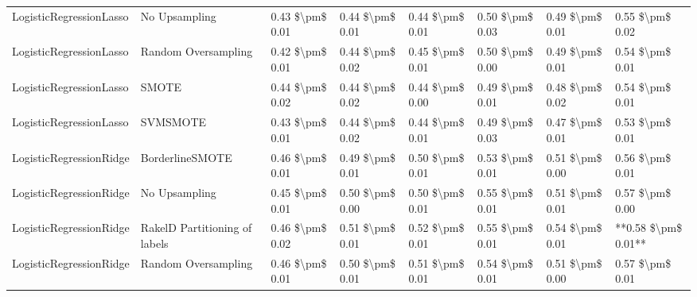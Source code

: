 \begin{tabular}{llllllll}
        LogisticRegressionLasso &                 No Upsampling & 0.43 \$\textbackslash pm\$ 0.01 &           0.44 \$\textbackslash pm\$ 0.01 &       0.44 \$\textbackslash pm\$ 0.01 &        0.50 \$\textbackslash pm\$ 0.03 &                         0.49 \$\textbackslash pm\$ 0.01 &     0.55 \$\textbackslash pm\$ 0.02 \\
        LogisticRegressionLasso &           Random Oversampling & 0.42 \$\textbackslash pm\$ 0.01 &           0.44 \$\textbackslash pm\$ 0.02 &       0.45 \$\textbackslash pm\$ 0.01 &        0.50 \$\textbackslash pm\$ 0.00 &                         0.49 \$\textbackslash pm\$ 0.01 &     0.54 \$\textbackslash pm\$ 0.01 \\
        LogisticRegressionLasso &                         SMOTE & 0.44 \$\textbackslash pm\$ 0.02 &           0.44 \$\textbackslash pm\$ 0.02 &       0.44 \$\textbackslash pm\$ 0.00 &        0.49 \$\textbackslash pm\$ 0.01 &                         0.48 \$\textbackslash pm\$ 0.02 &     0.54 \$\textbackslash pm\$ 0.01 \\
        LogisticRegressionLasso &                      SVMSMOTE & 0.43 \$\textbackslash pm\$ 0.01 &           0.44 \$\textbackslash pm\$ 0.02 &       0.44 \$\textbackslash pm\$ 0.01 &        0.49 \$\textbackslash pm\$ 0.03 &                         0.47 \$\textbackslash pm\$ 0.01 &     0.53 \$\textbackslash pm\$ 0.01 \\
        LogisticRegressionRidge &               BorderlineSMOTE & 0.46 \$\textbackslash pm\$ 0.01 &           0.49 \$\textbackslash pm\$ 0.01 &       0.50 \$\textbackslash pm\$ 0.01 &        0.53 \$\textbackslash pm\$ 0.01 &                         0.51 \$\textbackslash pm\$ 0.00 &     0.56 \$\textbackslash pm\$ 0.01 \\
        LogisticRegressionRidge &                 No Upsampling & 0.45 \$\textbackslash pm\$ 0.01 &           0.50 \$\textbackslash pm\$ 0.00 &       0.50 \$\textbackslash pm\$ 0.01 &        0.55 \$\textbackslash pm\$ 0.01 &                         0.51 \$\textbackslash pm\$ 0.01 &     0.57 \$\textbackslash pm\$ 0.00 \\
        LogisticRegressionRidge & RakelD Partitioning of labels & 0.46 \$\textbackslash pm\$ 0.02 &           0.51 \$\textbackslash pm\$ 0.01 &       0.52 \$\textbackslash pm\$ 0.01 &        0.55 \$\textbackslash pm\$ 0.01 &                         0.54 \$\textbackslash pm\$ 0.01 & **0.58 \$\textbackslash pm\$ 0.01** \\
        LogisticRegressionRidge &           Random Oversampling & 0.46 \$\textbackslash pm\$ 0.01 &           0.50 \$\textbackslash pm\$ 0.01 &       0.51 \$\textbackslash pm\$ 0.01 &        0.54 \$\textbackslash pm\$ 0.01 &                         0.51 \$\textbackslash pm\$ 0.00 &     0.57 \$\textbackslash pm\$ 0.01 \\

\end{tabular}
